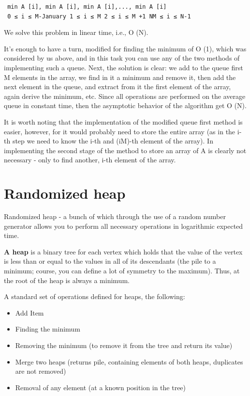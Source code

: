 \begin{verbatim}
 min A [i], min A [i], min A [i],..., min A [i]
 0 ≤ i ≤ M-January 1 ≤ i ≤ M 2 ≤ i ≤ M +1 NM ≤ i ≤ N-1 
\end{verbatim}
We solve this problem in linear time, i.e., O (N).

It's enough to have a turn, modified for finding the minimum of O (1), which was considered by us above, and in this task you can use any of the two methods of implementing such a queue. Next, the solution is clear: we add to the queue first M elements in the array, we find in it a minimum and remove it, then add the next element in the queue, and extract from it the first element of the array, again derive the minimum, etc. Since all operations are performed on the average queue in constant time, then the asymptotic behavior of the algorithm get O (N).

It is worth noting that the implementation of the modified queue first method is easier, however, for it would probably need to store the entire array (as in the i-th step we need to know the i-th and (iM)-th element of the array). In implementing the second stage of the method to store an array of A is clearly not necessary - only to find another, i-th element of the array.

\section{ Randomized heap }
Randomized heap - a bunch of which through the use of a random number generator allows you to perform all necessary operations in logarithmic expected time.

\textbf{A heap} is a binary tree for each vertex which holds that the value of the vertex is less than or equal to the values ​​in all of its descendants (the pile to a minimum; course, you can define a lot of symmetry to the maximum). Thus, at the root of the heap is always a minimum.

A standard set of operations defined for heaps, the following:

\begin{itemize}
\item Add Item
\item Finding the minimum
\item Removing the minimum (to remove it from the tree and return its value)
\item Merge two heaps (returns pile, containing elements of both heaps, duplicates are not removed)
\item Removal of any element (at a known position in the tree)
\end{itemize}

